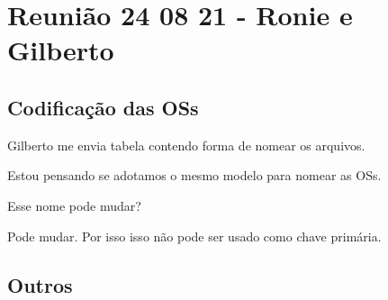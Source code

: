 \section{Reunião 24 08 21 - Ronie e Gilberto}

\subsection{Codificação das OSs}

Gilberto me envia tabela contendo forma de nomear os arquivos.

Estou pensando se adotamos o mesmo modelo para nomear as OSs.


Esse nome pode mudar? 

Pode mudar. Por isso isso não pode ser usado como chave primária.


\subsection{Outros}






